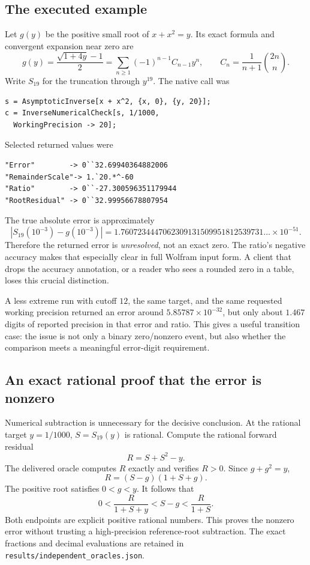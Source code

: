 \documentclass[11pt,letterpaper]{article}
\newcommand{\code}[1]{{\small\nolinkurl{#1}}}
\begin{document}
\subsection{The executed example}
Let $g(y)$ be the positive small root of $x+x^2=y$. Its exact formula and convergent expansion near zero are
\begin{equation}
 g(y)=\frac{\sqrt{1+4y}-1}{2}
     =\sum_{n\ge1}(-1)^{n-1}C_{n-1}y^n,
 \qquad C_n=\frac{1}{n+1}\binom{2n}{n}.
 \label{eq:catalan}
\end{equation}
Write $S_{19}$ for the truncation through $y^{19}$. The native call was
\begin{lstlisting}
s = AsymptoticInverse[x + x^2, {x, 0}, {y, 20}];
c = InverseNumericalCheck[s, 1/1000,
  WorkingPrecision -> 20];
\end{lstlisting}
Selected returned values were
\begin{lstlisting}
"Error"        -> 0``32.69940364882006
"RemainderScale"-> 1.`20.*^-60
"Ratio"        -> 0``-27.300596351179944
"RootResidual" -> 0``32.99956678807954
\end{lstlisting}
The true absolute error is approximately
\begin{equation}
 |S_{19}(10^{-3})-g(10^{-3})|
 =1.7607234447062309131509951812539731\ldots\times10^{-51}.
 \label{eq:errorvalue}
\end{equation}
Therefore the returned error is \emph{unresolved}, not an exact zero. The ratio's negative accuracy makes that especially clear in full Wolfram input form. A client that drops the accuracy annotation, or a reader who sees a rounded zero in a table, loses this crucial distinction.

A less extreme run with cutoff $12$, the same target, and the same requested working precision returned an error around $5.85787\times10^{-32}$, but only about $1.467$ digits of reported precision in that error and ratio. This gives a useful transition case: the issue is not only a binary zero/nonzero event, but also whether the comparison meets a meaningful error-digit requirement.

\subsection{An exact rational proof that the error is nonzero}
Numerical subtraction is unnecessary for the decisive conclusion. At the rational target $y=1/1000$, $S=S_{19}(y)$ is rational. Compute the rational forward residual
\[
 R=S+S^2-y.
\]
The delivered oracle computes $R$ exactly and verifies $R>0$. Since $g+g^2=y$,
\begin{equation}
 R=(S-g)(1+S+g).
 \label{eq:residualidentity}
\end{equation}
The positive root satisfies $0<g<y$. It follows that
\begin{equation}
 0<\frac{R}{1+S+y}<S-g<\frac{R}{1+S}.
 \label{eq:rationalbounds}
\end{equation}
Both endpoints are explicit positive rational numbers. This proves the nonzero error without trusting a high-precision reference-root subtraction. The exact fractions and decimal evaluations are retained in \code{results/independent_oracles.json}.
\end{document}
